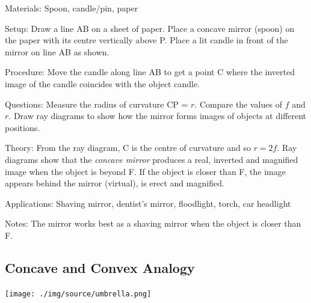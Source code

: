 \begin{multicols}{2}
\begin{description*}
\item[Materials:]{Spoon, candle/pin, paper}
\item[Setup:]{Draw a line AB on a sheet of paper. Place a concave mirror (spoon) on the paper with its centre vertically above P. Place a lit candle in front of the mirror on line AB as shown.}
\item[Procedure:]{Move the candle along line AB to get a point C where the inverted image of the candle coincides with the object candle.}
\item[Questions:]{Measure the radius of curvature CP = $r$. Compare the values of $f$ and $r$. Draw ray diagrams to show how the mirror forms images of objects at different positions.}
\item[Theory:]{From the ray diagram, C is the centre of curvature and so $r=2f$. Ray diagrams show that the \emph{concave mirror} produces a real, inverted and magnified image when the object is beyond F. If the object is closer than F, the image appears behind the mirror (virtual), is erect and magnified.}
\item[Applications:]{Shaving mirror, dentist's mirror, floodlight, torch, car headlight}
\item[Notes:]{The mirror works best as a shaving mirror when the object is closer than F.}
\end{description*}

\vfill
\columnbreak

\subsection{Concave and Convex Analogy}

\begin{center}
\texttt{[image: ./img/source/umbrella.png]}
\end{center}


\end{multicols}

